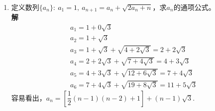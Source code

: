 \begin{enumerate}[label={【\textbf{例\thechapter.\arabic*}】},
 leftmargin=\inteval{\myenumleftmargin}pt,
 itemsep=\inteval{\myenumitempsep}pt,
 itemindent=\inteval{\myenumitemindent}pt]
满足$ m^2-5n^2=1 $的整数$ m,n $更稀少，在$ |m|<1000 $的范围内，
只有如下两组：
\begin{gather*}
    9^2-5\cdot 4^2=1,\quad  161^2-5\cdot 72^2=1
\end{gather*}
\textbf{注2}：敏锐的读者应该能察觉到，上面的$ \sqrt{3},\sqrt{5} $(只要$ \sqrt{C} $
不是有理数)与虚数单位$ \i $存在一些相似之处，消去$ \dfrac{1}{A+B\sqrt{C}} $
分母中的根号，与消去$ \dfrac{1}{A+B\i} $分母中的$ \i $，方法是一样的。对于复数
$ z_1,z_2 $，有$ |z_1z_2|=|z_1||z_2| $，但对于本例中的$ x $，不论是定义
$ |x|=\sqrt{a^2+b^2} $还是定义$ |x|=\sqrt{a^2+3b^2} $，
$ |xy| $与$ |x||y| $都不相等。不过有以下恒等式：
\begin{equation}\label{a2+kb2恒等式}
\begin{aligned}
        (a^2+kb^2)(c^2+kd^2)=&\ a^2c^2+k^2b^2d^2+k(a^2d^2+b^2c^2) \\
    =&\ a^2c^2-2kabcd+k^2b^2d^2+k(a^2d^2+2abcd+b^2c^2) \\
    =&\ (ac-kbd)^2+k(ad+bc)^2 \\
    =&\ (ac+kbd)^2+k(ad-bc)^2 
\end{aligned}
\end{equation}
\begin{gather}\label{a2-kb2恒等式}
    (a^2-kb^2)(c^2-kd^2)=(ac-kbd)^2-k(ad-bc)^2=(ac+kbd)^2-k(ad+bc)^2
\end{gather}

\item 定义数列$ \{a_n\}:\ a_1=1,\ a_{n+1}=a_n+\sqrt{2a_n+n} $，求$ a_n $的通项公式。\\
\textbf{解}\ 
\begin{align*}
    & a_1=1+0\sqrt{3} \\
    & a_2=1+\sqrt{3} \\
    & a_3=1+\sqrt{3}+\sqrt{4+2\sqrt{3}}=2+2\sqrt{3} \\
    & a_4=2+2\sqrt{3}+\sqrt{7+4\sqrt{3}}=4+3\sqrt{3} \\
    & a_5=4+3\sqrt{3}+\sqrt{12+6\sqrt{3}}=7+4\sqrt{3} \\
    & a_6=7+4\sqrt{3}+\sqrt{19+8\sqrt{3}}=11+5\sqrt{3} 
\end{align*}
容易看出，$ a_n=\left[\dfrac{1}{2}(n-1)(n-2)+1\right]+(n-1)\sqrt{3} $.


\end{enumerate}
